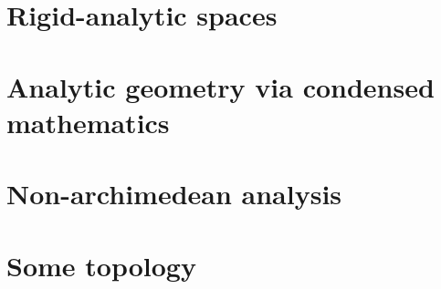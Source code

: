         \chapter{Rigid-analytic spaces}
            \begin{abstract}
                
            \end{abstract}
            
            \minitoc
            
            
            
            
            
        \chapter{Analytic geometry via condensed mathematics}
            \begin{abstract}
            
            \end{abstract}
            
            \minitoc
            
            
            
            

        \begin{appendices}
            \chapter{Non-archimedean analysis}
                \begin{abstract}
                    
                \end{abstract}
                
                \minitoc
        
            \chapter{Some topology}
                \begin{abstract}
                    
                \end{abstract}
                
                \minitoc
                
                
                
                
        \end{appendices}

